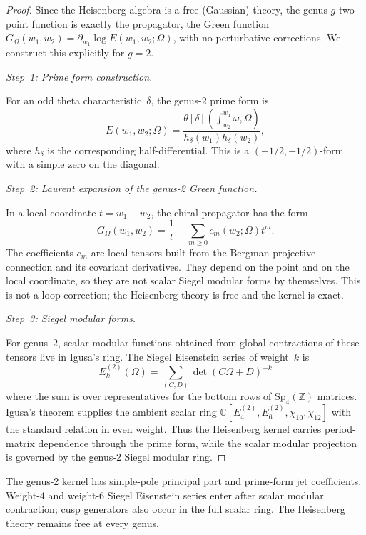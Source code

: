 \begin{proof}
Since the Heisenberg algebra is a free (Gaussian) theory, the genus-$g$
two-point function is exactly the propagator, the Green function
$G_\Omega(w_1, w_2) = \partial_{w_1}\log E(w_1, w_2; \Omega)$, with
no perturbative corrections. We construct this explicitly for $g = 2$.

\emph{Step~1: Prime form construction.}

For an odd theta characteristic~$\delta$, the genus-2 prime form is
\[
E(w_1,w_2;\Omega)
=\frac{\theta[\delta](\int_{w_2}^{w_1}\omega,\Omega)}
{h_\delta(w_1)h_\delta(w_2)},
\]
where $h_\delta$ is the corresponding half-differential. This is a
$(-1/2,-1/2)$-form with a simple zero on the diagonal.

\emph{Step~2: Laurent expansion of the genus-2 Green function.}

In a local coordinate $t=w_1-w_2$, the chiral propagator has the
form
\[
G_\Omega(w_1,w_2)=\frac1t+\sum_{m\ge0}c_m(w_2;\Omega)t^m .
\]
The coefficients $c_m$ are local tensors built from the Bergman
projective connection and its covariant derivatives. They depend on
the point and on the local coordinate, so they are not scalar Siegel
modular forms by themselves. This is not a loop correction; the
Heisenberg theory is free and the kernel is exact.

\emph{Step~3: Siegel modular forms.}

For genus~$2$, scalar modular functions obtained from global
contractions of these tensors live in Igusa's ring. The Siegel
Eisenstein series of weight~$k$ is
\[
E_k^{(2)}(\Omega) = \sum_{(C,D)} \det(C\Omega + D)^{-k}
\]
where the sum is over representatives for the bottom rows of
$\mathrm{Sp}_4(\mathbb{Z})$ matrices. Igusa's theorem supplies the
ambient scalar ring
$\mathbb{C}[E_4^{(2)},E_6^{(2)},\chi_{10},\chi_{12}]$ with the
standard relation in even weight. Thus the Heisenberg kernel carries
period-matrix dependence through the prime form, while the scalar
modular projection is governed by the genus-2 Siegel modular ring.
\end{proof}

\begin{remark}\label{rem:genus-two-prime-form-carrier}
The genus-2 kernel has simple-pole principal part and prime-form
jet coefficients. Weight-$4$ and weight-$6$ Siegel Eisenstein series
enter after scalar modular contraction; cusp generators also occur in
the full scalar ring. The Heisenberg theory remains free at every
genus.
\end{remark}


